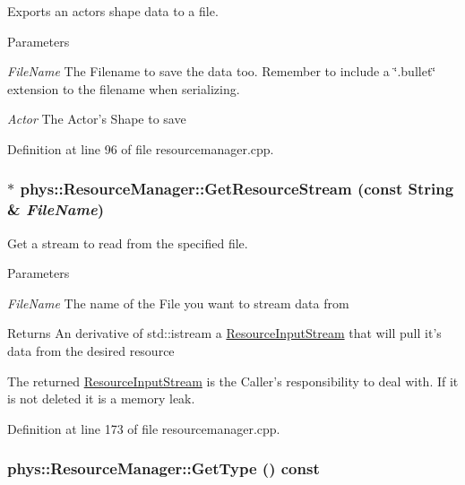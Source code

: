 Exports an actors shape data to a file. 


\begin{DoxyParams}{Parameters}
\item[{\em FileName}]The Filename to save the data too. Remember to include a \char`\"{}.bullet\char`\"{} extension to the filename when serializing. \item[{\em Actor}]The Actor's Shape to save \end{DoxyParams}


Definition at line 96 of file resourcemanager.cpp.

\hypertarget{classphys_1_1ResourceManager_a13f0aef080b9a353fe6c910c2781de50}{
\subsubsection[{GetResourceStream}]{ $\ast$ phys::ResourceManager::GetResourceStream (const {\bf String} \& {\em FileName})}}
\label{d1/d35/classphys_1_1ResourceManager_a13f0aef080b9a353fe6c910c2781de50}


Get a stream to read from the specified file. 


\begin{DoxyParams}{Parameters}
\item[{\em FileName}]The name of the File you want to stream data from \end{DoxyParams}
\begin{DoxyReturn}{Returns}
An derivative of std::istream a \hyperlink{classphys_1_1ResourceInputStream}{ResourceInputStream} that will pull it's data from the desired resource
\end{DoxyReturn}
The returned \hyperlink{classphys_1_1ResourceInputStream}{ResourceInputStream} is the Caller's responsibility to deal with. If it is not deleted it is a memory leak. 

Definition at line 173 of file resourcemanager.cpp.

\hypertarget{classphys_1_1ResourceManager_a9e5468e5428f5c108c7b3c01e94eba46}{
\subsubsection[{GetType}]{ phys::ResourceManager::GetType () const}}
\label{d1/d35/classphys_1_1ResourceManager_a9e5468e5428f5c108c7b3c01e94eba46}


